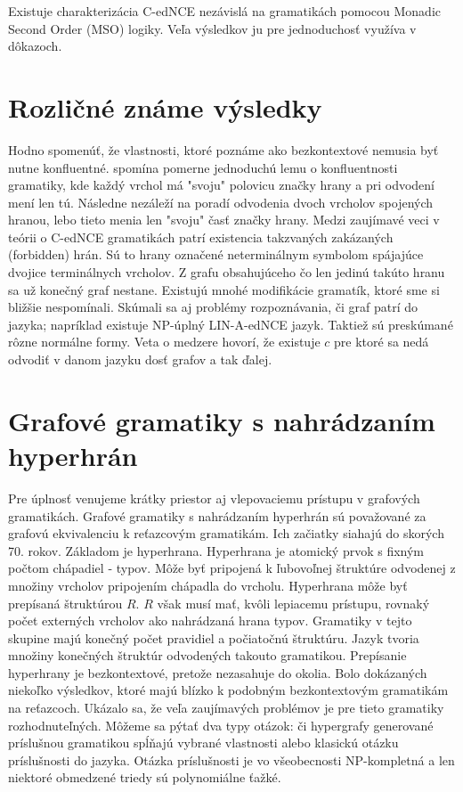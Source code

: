 \begin{pozn}
Existuje charakterizácia C-edNCE nezávislá na gramatikách pomocou Monadic Second Order (MSO) logiky.
Veľa výsledkov ju pre jednoduchosť využíva v dôkazoch.
\end{pozn}

\section{Rozličné známe výsledky}

Hodno spomenúť, že vlastnosti, ktoré poznáme ako bezkontextové nemusia byť
nutne konfluentné. \cite{GG} spomína pomerne jednoduchú lemu o
konfluentnosti gramatiky, kde každý vrchol má "svoju" polovicu značky hrany a
pri odvodení mení len tú. Následne nezáleží na poradí odvodenia dvoch
vrcholov spojených hranou, lebo tieto menia len "svoju" časť značky hrany.
Medzi zaujímavé veci v teórii o C-edNCE gramatikách patrí existencia
takzvaných zakázaných (forbidden) hrán. Sú to hrany označené neterminálnym
symbolom spájajúce dvojice terminálnych vrcholov. Z grafu obsahujúceho čo
len jedinú takúto hranu sa už konečný graf nestane.
Existujú mnohé modifikácie gramatík, ktoré sme si bližšie nespomínali.
Skúmali sa aj problémy rozpoznávania, či graf patrí do jazyka; 
napríklad existuje NP-úplný LIN-A-edNCE jazyk.
Taktiež sú preskúmané rôzne normálne formy. Veta o medzere hovorí, že
existuje $c$ pre ktoré sa nedá odvodiť v danom jazyku dosť grafov a tak
ďalej.

\section{Grafové gramatiky s nahrádzaním hyperhrán}
Pre úplnosť venujeme krátky priestor aj vlepovaciemu prístupu v grafových
gramatikách.
Grafové gramatiky s nahrádzaním hyperhrán sú považované za grafovú
ekvivalenciu k reťazcovým gramatikám. Ich začiatky siahajú do skorých 70.
rokov. Základom je hyperhrana. Hyperhrana je atomický prvok s fixným počtom
chápadiel - typov. Môže byť pripojená k ľubovoľnej štruktúre odvodenej z
množiny vrcholov pripojením chápadla do vrcholu. Hyperhrana môže byť
prepísaná štruktúrou $R$. $R$ však musí mať, kvôli lepiacemu prístupu,
rovnaký počet externých vrcholov ako nahrádzaná hrana typov.
Gramatiky v tejto skupine majú konečný počet pravidiel a počiatočnú
štruktúru. Jazyk tvoria množiny konečných štruktúr odvodených takouto
gramatikou. Prepísanie hyperhrany je bezkontextové, pretože nezasahuje do
okolia. Bolo dokázaných niekoľko výsledkov, ktoré majú blízko k podobným
bezkontextovým gramatikám na reťazcoch. Ukázalo sa, že veľa zaujímavých
problémov je pre tieto gramatiky rozhodnuteľných.
Môžeme sa pýtať dva typy otázok: či hypergrafy generované príslušnou
gramatikou spĺňajú vybrané vlastnosti alebo klasickú otázku príslušnosti do
jazyka. Otázka príslušnosti je vo všeobecnosti NP-kompletná a len niektoré
obmedzené  triedy sú polynomiálne ťažké.
\iffalse
/? TODO
regulárne grafové gramatiky
TODO ?/

Zaujímajú nás predovšetkým výsledky týkajúce sa "náročnosti" generovania 
grafov, ktoré je možné porovnávať s výsledkami nášho prístupu.
\fi


